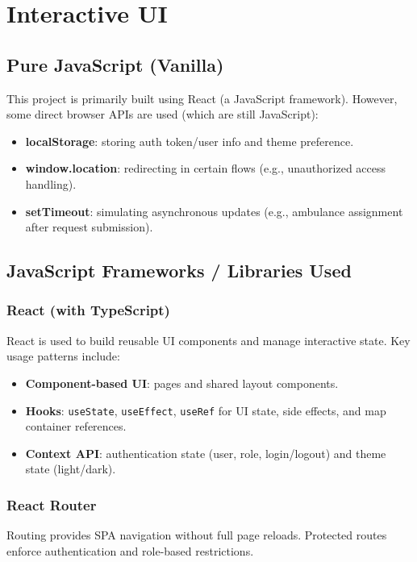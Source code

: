 \documentclass[12pt,a4paper]{report}
\begin{document}
\chapter{Interactive UI}

\section{Pure JavaScript (Vanilla)}
This project is primarily built using React (a JavaScript framework). However, some direct browser APIs are used (which are still JavaScript):
\begin{itemize}[leftmargin=1.2cm]
  \item \textbf{localStorage}: storing auth token/user info and theme preference.
  \item \textbf{window.location}: redirecting in certain flows (e.g., unauthorized access handling).
  \item \textbf{setTimeout}: simulating asynchronous updates (e.g., ambulance assignment after request submission).
\end{itemize}

\section{JavaScript Frameworks / Libraries Used}
\subsection{React (with TypeScript)}
React is used to build reusable UI components and manage interactive state. Key usage patterns include:
\begin{itemize}[leftmargin=1.2cm]
  \item \textbf{Component-based UI}: pages and shared layout components.
  \item \textbf{Hooks}: \texttt{useState}, \texttt{useEffect}, \texttt{useRef} for UI state, side effects, and map container references.
  \item \textbf{Context API}: authentication state (user, role, login/logout) and theme state (light/dark).
\end{itemize}

\subsection{React Router}
Routing provides SPA navigation without full page reloads. Protected routes enforce authentication and role-based restrictions.
\end{document}
